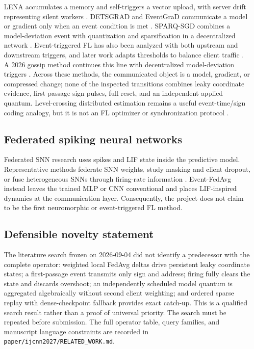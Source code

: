 LENA accumulates a memory and self-triggers a vector upload, with server drift
representing silent workers \citep{ghadikolaei2021lena}. DETSGRAD and EventGraD
communicate a model or gradient only when an event condition is met
\citep{george2020detsgrad,ghosh2022eventgrad}. SPARQ-SGD combines a
model-deviation event with quantization and sparsification in a decentralized
network \citep{singh2023sparq}. Event-triggered FL has also been analyzed with
both upstream and downstream triggers, and later work adapts thresholds to
balance client traffic \citep{he2023etfl,yoon2025etfl}. A 2026 gossip method
continues this line with decentralized model-deviation triggers
\citep{zhai2026gossip}. Across these methods, the communicated object is a
model, gradient, or compressed change; none of the inspected transitions
combines leaky coordinate evidence, first-passage sign pulses, full reset, and
an independent applied quantum. Level-crossing distributed estimation remains
a useful event-time/sign coding analogy, but it is not an FL optimizer or
synchronization protocol \citep{utlu2017level}.

\subsection{Federated spiking neural networks}

Federated SNN research uses spikes and LIF state inside the predictive model.
Representative methods federate SNN weights, study masking and client dropout,
or fuse heterogeneous SNNs through firing-rate information
\citep{venkatesha2021fedsnn,chaki2023tradeoffs,tao2026sfedhifi}. Event-FedAvg
instead leaves the trained MLP or CNN conventional and places LIF-inspired
dynamics at the communication layer. Consequently, the project does not claim
to be the first neuromorphic or event-triggered FL method.

\subsection{Defensible novelty statement}

The literature search frozen on 2026-09-04 did not identify a predecessor with
the complete operator: weighted local FedAvg deltas drive persistent leaky
coordinate states; a first-passage event transmits only sign and address;
firing fully clears the state and discards overshoot; an independently
scheduled model quantum is aggregated algebraically without second client
weighting; and ordered sparse replay with dense-checkpoint fallback provides
exact catch-up. This is a qualified search result rather than a proof of
universal priority. The search must be repeated before submission. The full
operator table, query families, and manuscript language constraints are
recorded in \texttt{paper/ijcnn2027/RELATED\_WORK.md}.
